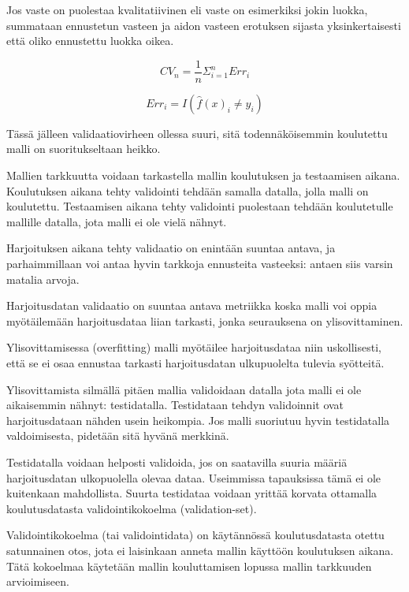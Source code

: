 \documentclass[finnish,twoside,openright]{HYgraduMLDS}
\begin{document}
Jos vaste on puolestaa kvalitatiivinen eli vaste on esimerkiksi jokin luokka, summataan ennustetun vasteen ja aidon vasteen erotuksen sijasta yksinkertaisesti että oliko ennustettu luokka oikea\cite{james2013ISLR}.

\begin{equation}
    CV_{n} = \frac{1}{n} \Sigma^n_{i=1} Err_i
\end{equation}

\begin{equation}
    Err_i = I(\hat{f}(x)_i \neq y_i)
\end{equation}

Tässä jälleen validaatiovirheen ollessa suuri, sitä todennäköisemmin koulutettu malli on suoritukseltaan heikko.

Mallien tarkkuutta voidaan tarkastella mallin koulutuksen ja testaamisen aikana. Koulutuksen aikana tehty validointi tehdään samalla datalla, jolla malli on koulutettu. Testaamisen aikana tehty validointi puolestaan tehdään koulutetulle mallille datalla, jota malli ei ole vielä nähnyt.

Harjoituksen aikana tehty validaatio on enintään suuntaa antava, ja parhaimmillaan voi antaa hyvin tarkkoja ennusteita vasteeksi: antaen siis varsin matalia arvoja. 

Harjoitusdatan validaatio on suuntaa antava metriikka koska malli voi oppia myötäilemään harjoitusdataa liian tarkasti, jonka seurauksena on ylisovittaminen.

Ylisovittamisessa (overfitting) malli myötäilee harjoitusdataa niin uskollisesti, että se ei osaa ennustaa tarkasti harjoitusdatan ulkupuolelta tulevia syötteitä.

Ylisovittamista silmällä pitäen mallia validoidaan datalla jota malli ei ole aikaisemmin nähnyt: testidatalla. Testidataan tehdyn validoinnit ovat harjoitusdataan nähden usein heikompia. Jos malli suoriutuu hyvin testidatalla valdoimisesta, pidetään sitä hyvänä merkkinä.

Testidatalla voidaan helposti validoida, jos on saatavilla suuria määriä harjoitusdatan ulkopuolella olevaa dataa. Useimmissa tapauksissa tämä ei ole kuitenkaan mahdollista. Suurta testidataa voidaan yrittää korvata ottamalla koulutusdatasta validointikokoelma (validation-set). 

Validointikokoelma (tai validointidata) on käytännössä koulutusdatasta otettu satunnainen otos, jota ei laisinkaan anneta mallin käyttöön koulutuksen aikana. Tätä kokoelmaa käytetään mallin kouluttamisen lopussa mallin tarkkuuden arvioimiseen. 
\end{document}
